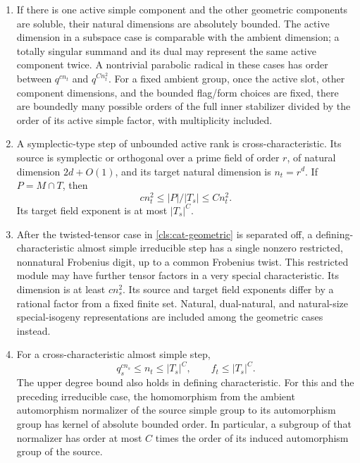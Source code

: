 \begin{proposition}
\begin{enumerate}[label=\textup{(C\arabic*)},start=2]
\item\label{cls:cat-inactive}
If there is one active simple component and the other geometric
components are soluble, their natural dimensions are absolutely
bounded.  The active dimension in a subspace case is comparable with
the ambient dimension; a totally singular summand and its dual may
represent the same active component twice.  A nontrivial parabolic
radical in these cases has order between $q^{c n_t}$ and $q^{C n_t^2}$.
For a fixed ambient group, once the active slot, other component
dimensions, and the bounded flag/form choices are fixed, there are
boundedly many possible orders of the full inner stabilizer divided by
the order of its active simple factor, with multiplicity included.
\item\label{cls:cat-symplectic}
A symplectic-type step of unbounded active rank is
cross-characteristic.  Its source is symplectic or orthogonal over a
prime field of order $r$, of natural dimension $2d+O(1)$, and its
target natural dimension is $n_t=r^d$.  If $P=M\cap T$, then
\[
 c n_t^2\leq |P|/|T_s|\leq C n_t^2.
\]
Its target field exponent is at most $|T_s|^C$.
\item\label{cls:cat-nonlinear}
After the twisted-tensor case in
\ref{cls:cat-geometric} is separated off, a defining-characteristic almost simple
irreducible step has a single nonzero restricted, nonnatural
Frobenius digit, up to a common Frobenius twist.  This restricted
module may have further tensor factors in a very special
characteristic.  Its dimension is at least $c n_s^2$.  Its source and target field
exponents differ by a rational factor from a fixed finite set.
Natural, dual-natural, and natural-size special-isogeny representations
are included among the geometric cases instead.
\item\label{cls:cat-cross}
For a cross-characteristic almost simple step,
\[
 q_s^{c n_s}\leq n_t\leq |T_s|^C,
 \qquad f_t\leq |T_s|^C.
\]
The upper degree bound also holds in defining characteristic.
For this and the preceding irreducible case, the homomorphism from the
ambient automorphism normalizer of the source simple group to its
automorphism group has kernel of absolute bounded order.  In
particular, a subgroup of that normalizer has order at most
$C$ times the order of its induced automorphism group of the source.
\end{enumerate}
\end{proposition}

